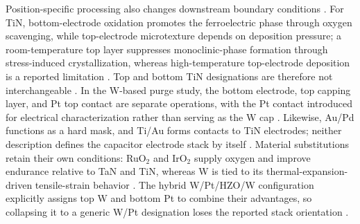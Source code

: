 \documentclass[11pt,a4paper]{report}
\begin{document}
Position-specific processing also changes downstream boundary conditions \cite{schroeder2023road,kim2020tin}. For TiN, bottom-electrode oxidation promotes the ferroelectric phase through oxygen scavenging, while top-electrode microtexture depends on deposition pressure; a room-temperature top layer suppresses monoclinic-phase formation through stress-induced crystallization, whereas high-temperature top-electrode deposition is a reported limitation \cite{schroeder2023road,kim2020tin}. Top and bottom TiN designations are therefore not interchangeable \cite{kim2020tin}. In the W-based purge study, the bottom electrode, top capping layer, and Pt top contact are separate operations, with the Pt contact introduced for electrical characterization rather than serving as the W cap \cite{choi2025purge}. Likewise, Au/Pd functions as a hard mask, and Ti/Au forms contacts to TiN electrodes; neither description defines the capacitor electrode stack by itself \cite{kim2020tin,kaatranen2026unif}. Material substitutions retain their own conditions: RuO$_2$ and IrO$_2$ supply oxygen and improve endurance relative to TaN and TiN, whereas W is tied to its thermal-expansion-driven tensile-strain behavior \cite{schroeder2023road}. The hybrid W/Pt/HZO/W configuration explicitly assigns top W and bottom Pt to combine their advantages, so collapsing it to a generic W/Pt designation loses the reported stack orientation \cite{kashir2021wake}.
\end{document}
